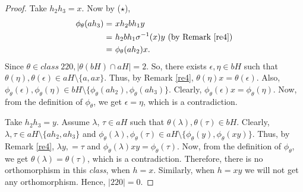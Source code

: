 \documentclass[11pt,a4paper]{article}
\theoremstyle{definition}
\theoremstyle{remark}
\begin{document}
\begin{proof}
	 Take $h_{2}h_{3} = x$. Now  by ($\star$), 
	\begin{align*}
		\phi_{\theta}(ah_{3}) =&~ xh_{2}bh_{1}y \\
		=&~ h_{2}bh_{1}\sigma^{-1}(x)y \text{  (by Remark \ref{re4})}\\
		=&~ \phi_{\theta}(ah_{2})x.
	\end{align*}
	   Since $\theta \in class~220, |\theta(bH) \cap aH| = 2.$ So, there exists $\epsilon, \eta \in bH$ such that $\theta(\eta), \theta(\epsilon) \in aH \setminus \{a, ax\}.$ Thus, by Remark \ref{re4}, $\theta(\eta)x = \theta(\epsilon)$. Also, $\phi_{\theta}(\epsilon), \phi_{\theta}(\eta) \in bH \setminus \{\phi_{\theta}(ah_{2}),\phi_{\theta}(ah_{3})\}$. Clearly, $\phi_{\theta}(\epsilon)x = \phi_{\theta}(\eta)$.
Now, from the definition of $\phi_{\theta}$, we  get $\epsilon = \eta$,  which is a contradiction.
		
		
		Take $h_{2}h_{3} = y$. Assume $\lambda$, $\tau \in aH$ such that $\theta(\lambda), \theta(\tau) \in bH$. Clearly, $\lambda, \tau \in aH \setminus\{ah_{2},ah_{3}\}$ and  $\phi_{\theta}(\lambda), \phi_{\theta}(\tau) \in aH \setminus \{\phi_{\theta}(y), \phi_{\theta}(xy)\}$. Thus, by Remark \ref{re4}, $\lambda y, = \tau$ and $\phi_{\theta}(\lambda)xy  = \phi_{\theta}(\tau).$ Now, from the definition of $\phi_{\theta}$, we get $\theta(\lambda) = \theta(\tau)$, which is a contradiction. Therefore, there is no orthomorphism in this \textit{class}, when $h=x$.
		Similarly, when $h=xy$ we will not get any orthomorphism. 
		Hence, $\vert 220 \vert = 0$.
		
	\end{proof}
\end{document}
